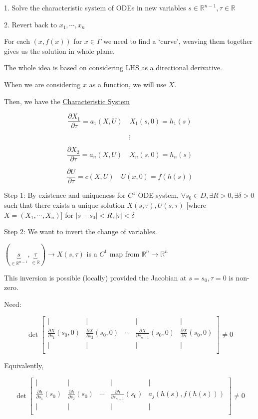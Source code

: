 \documentclass{article}
\theoremstyle{definition}
\begin{document}
1. Solve the characteristic system of ODEs in new variables \(s\in\mathbb{R}^{n-1},\tau\in\mathbb{R}\)

2. Revert back to \(x_1,\cdots,x_n\)

For each \((x,f(x))\) for \(x\in \Gamma\) we need to find a `curve', weaving them together gives us the solution in whole plane. 

The whole idea is based on considering LHS as a directional derivative.

When we are considering \(x\) as a function, we will use \(X\).

Then, we have the \underline{Characteristic System} 

\[
    \frac{\partial X_1}{\partial \tau} = a_1(X,U) \quad X_1(s,0)=h_1(s)
\]

\[
    \vdots
\]

\[
    \frac{\partial X_2}{\partial \tau} = a_n (X,U) \quad X_n(s,0)=h_n(s)
\]

\[
    \frac{\partial U}{\partial \tau} = c(X,U)\quad U(x,0)=f(h(s))
\]

Step 1: By existence and uniqueness for \(C^1\) ODE system, \(\forall s_0\in D, \exists R > 0, \exists \delta >0\) such that there exists a unique solution \(X(s,\tau),U(s,\tau)\) [where \(X = (X_1,\cdots, X_n)\)] for \(\vert s - s_0 \vert < R, \vert \tau \vert < \delta\) 

Step 2: We want to invert the change of variables.

\((\underbrace{s}_{\in\mathbb{R}^{n-1}},\underbrace{\tau}_{\in\mathbb{R}}) \to X(s,\tau)\) is a \(C^1\) map from \(\mathbb{R}^n \to \mathbb{R}^n\)

This inversion is possible (locally) provided the Jacobian at \(s=s_0,\tau=0\) is non-zero.

Need:

\[
    \det \begin{bmatrix}
        \mid & \mid &  & \mid &  \mid \\
        \frac{\partial X}{\partial s_1} (s_0,0) & \frac{\partial X}{\partial s_2} (s_0,0) & \cdots & \frac{\partial X}{\partial s_{n-1}} (s_0,0) & \frac{\partial X}{\partial \tau} (s_0,0)  \\
        \mid & \mid &  & \mid & \mid  \\
    \end{bmatrix} \neq 0
\]

Equivalently,

\[
    \det \begin{bmatrix}
        \mid & \mid &  & \mid &  \mid \\
        \frac{\partial h}{\partial s_1} (s_0) & \frac{\partial h}{\partial s_2} (s_0) & \cdots & \frac{\partial h}{\partial s_{n-1}} (s_0)  &  a_j(h(s),f(h(s))) \\
        \mid & \mid &  & \mid & \mid  \\
    \end{bmatrix} \neq 0
\]
\end{document}
